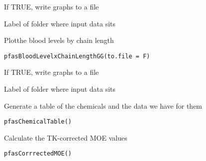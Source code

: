 \documentclass[letterpaper]{book}
\begin{document}
%
\begin{Arguments}
\begin{ldescription}
\item[\code{to.file}] If TRUE, write graphs to a file

\item[\code{data.version}] Label of folder where input data sits
\end{ldescription}
\end{Arguments}
%
\begin{Description}\relax
Plotthe blood levels by chain length
\end{Description}
%
\begin{Usage}
\begin{verbatim}
pfasBloodLevelxChainLengthGG(to.file = F)
\end{verbatim}
\end{Usage}
%
\begin{Arguments}
\begin{ldescription}
\item[\code{to.file}] If TRUE, write graphs to a file

\item[\code{data.version}] Label of folder where input data sits
\end{ldescription}
\end{Arguments}
%
\begin{Description}\relax
Generate a table of the chemicals and the data we have for them
\end{Description}
%
\begin{Usage}
\begin{verbatim}
pfasChemicalTable()
\end{verbatim}
\end{Usage}
%
\begin{Description}\relax
Calculate the TK-corrected MOE values
\end{Description}
%
\begin{Usage}
\begin{verbatim}
pfasCorrrectedMOE()
\end{verbatim}
\end{Usage}
\end{document}
